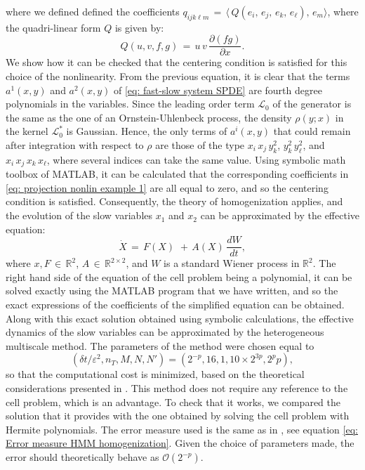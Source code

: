 where we defined defined the coefficients $q_{ijk{\ell}m} \,=\, \langle\, Q(e_i,\,e_j,\,e_k,\,e_{\ell}),\,e_m \rangle$, where the quadri-linear form $Q$ is given by:
\begin{equation*}
    Q(u,v,f,g) \,=\, u \, v \, \frac{{\partial}(fg)}{{\partial}x}. 
\end{equation*}
We show how it can be checked that the centering condition is satisfied for this choice of the nonlinearity. From the previous equation, it is clear that the terms $a^1(x,y)$ and $a^2(x,y)$ of \eqref{eq: fast-slow system SPDE} are fourth degree polynomials in the variables. Since the leading order term $\mathcal L_0$ of the generator is the same as the one of an Ornstein-Uhlenbeck process, the density ${\rho}(y;x)$ in the kernel $\mathcal L_0^*$ is Gaussian. Hence, the only terms of $a^i(x,y)$ that could remain after integration with respect to ${\rho}$ are those of the type $x_i\,x_j\, y_k^2$, $y_k^2\,y_{\ell}^2$, and $x_i\,x_j\,x_k\,x_{\ell}$, where several indices can take the same value. Using symbolic math toolbox of MATLAB, it can be calculated that the corresponding coefficients in \eqref{eq: projection nonlin example 1} are all equal to zero, and so the centering condition is satisfied. Consequently, the theory of homogenization applies, and the evolution of the slow variables $x_1$ and $x_2$ can be approximated by the effective equation:
\begin{equation}
    \dot X \,=\, F(X) \, \,+\, A(X) \, \frac{dW}{dt},
\end{equation}
where $x,F\,{\in}\,\mathbb R^2$, $A \,{\in}\,\mathbb R^{2{\times}2}$, and $W$ is a standard Wiener process in $\mathbb R^2$. The right hand side of the equation of the cell problem being a polynomial, it can be solved exactly using the MATLAB program that we have written, and so the exact expressions of the coefficients of the simplified equation can be obtained. Along with this exact solution obtained using symbolic calculations, the effective dynamics of the slow variables can be approximated by the heterogeneous multiscale method. The parameters of the method were chosen equal to $$ ({\delta}t/{\varepsilon}^2, n_T, M,N, N') = ( 2^{-p}, 16, 1 , 10{\times}2^{3p}, 2^pp),$$ so that the computational cost is minimized, based on the theoretical considerations presented in \cite{weinan2005analysis}. This method does not require any reference to the cell problem, which is an advantage. To check that it works, we compared the solution that it provides with the one obtained by solving the cell problem with Hermite polynomials. The error measure used is the same as in \cite{weinan2005analysis}, see equation \eqref{eq: Error measure HMM homogenization}. Given the choice of parameters made, the error should theoretically behave as $\mathcal O(2^{- p })$. 

